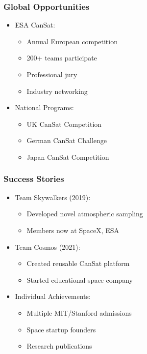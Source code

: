 \documentclass{beamer}
\begin{document}
\begin{frame}
\frametitle{Global Opportunities}
\begin{itemize}
\item ESA CanSat:
    \begin{itemize}
    \item Annual European competition
    \item 200+ teams participate
    \item Professional jury
    \item Industry networking
    \end{itemize}
\item National Programs:
    \begin{itemize}
    \item UK CanSat Competition
    \item German CanSat Challenge
    \item Japan CanSat Competition
    \end{itemize}
\end{itemize}
\end{frame}

\begin{frame}
\frametitle{Success Stories}
\begin{itemize}
\item Team Skywalkers (2019):
    \begin{itemize}
    \item Developed novel atmospheric sampling
    \item Members now at SpaceX, ESA
    \end{itemize}
\item Team Cosmos (2021):
    \begin{itemize}
    \item Created reusable CanSat platform
    \item Started educational space company
    \end{itemize}
\item Individual Achievements:
    \begin{itemize}
    \item Multiple MIT/Stanford admissions
    \item Space startup founders
    \item Research publications
    \end{itemize}
\end{itemize}
\end{frame}
\end{document}
